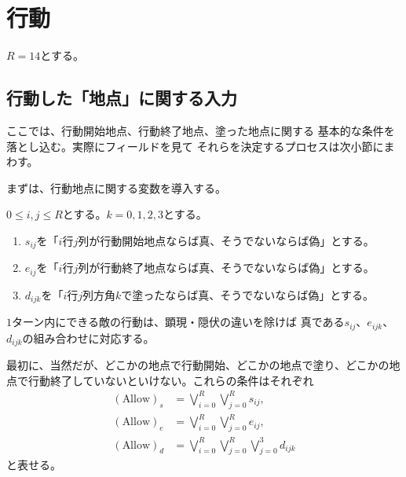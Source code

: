 
\section{行動}

$R = 14$とする。

\subsection{行動した「地点」に関する入力} \label{subsec:chiten}

ここでは、行動開始地点、行動終了地点、塗った地点に関する
基本的な条件を落とし込む。実際にフィールドを見て
それらを決定するプロセスは次小節にまわす。

まずは、行動地点に関する変数を導入する。

\begin{nota}
 $0 \leq i, j \leq R$とする。$k = 0, 1, 2 ,3$とする。
 \begin{enumerate}[1.]
  \item $s_{ij}$を「$i$行$j$列が行動開始地点ならば真、そうでないならば偽」とする。
  \item $e_{ij}$を「$i$行$j$列が行動終了地点ならば真、そうでないならば偽」とする。
  \item $d_{ijk}$を「$i$行$j$列方角$k$で塗ったならば真、そうでないならば偽」とする。
 \end{enumerate}
\end{nota}

\begin{rem} \label{rem:kumiawase}
 $1$ターン内にできる敵の行動は、顕現・隠伏の違いを除けば
 真である$s_{ij}$、$e_{ijk}$、$d_{ijk}$の組み合わせに対応する。
\end{rem}

最初に、当然だが、どこかの地点で行動開始、どこかの地点で塗り、どこかの地
点で行動終了していないといけない。これらの条件はそれぞれ
\begin{align*}
 (\text{Allow})_s &= \bigvee_{i = 0}^R \bigvee_{j = 0}^R s_{ij}, \\
 (\text{Allow})_e &= \bigvee_{i = 0}^R \bigvee_{j = 0}^R e_{ij}, \\
 (\text{Allow})_d &=
 \bigvee_{i = 0}^R \bigvee_{j = 0}^R \bigvee_{j = 0}^3 d_{ijk}
\end{align*}
と表せる。

